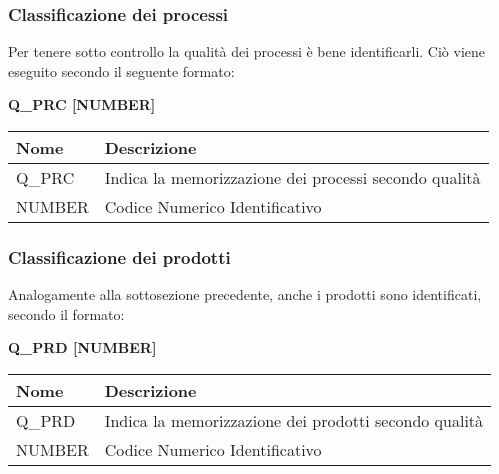 \subsubsection{Classificazione dei processi}
Per tenere sotto controllo la qualità dei processi è bene identificarli. 
Ciò viene eseguito secondo il seguente formato:
\begin{center}
    \textbf{Q\_PRC [NUMBER]}
\end{center} \newline
\renewcommand{\arraystretch}{1.8} %
    \begin{tabular}{ |m{7em}|m{30em}| }
        \hline
        \textbf{Nome} & \textbf{Descrizione} \\
        \hline
            Q\_PRC & Indica la memorizzazione dei processi secondo qualità \\
        \hline
            NUMBER & Codice Numerico Identificativo \\
        \hline
    \end{tabular}
\subsubsection{Classificazione dei prodotti}
Analogamente alla sottosezione precedente, anche i prodotti sono identificati, secondo il formato:
\begin{center}
    \textbf{Q\_PRD [NUMBER]}
\end{center}
\renewcommand{\arraystretch}{1.8} %
    \begin{tabular}{ |m{7em}|m{30em}| }
        \hline
        \textbf{Nome} & \textbf{Descrizione} \\
        \hline
            Q\_PRD & Indica la memorizzazione dei prodotti secondo qualità \\
        \hline
            NUMBER & Codice Numerico Identificativo \\
        \hline
    \end{tabular}